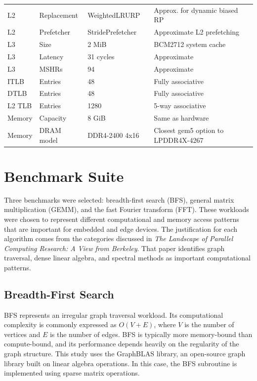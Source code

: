 \documentclass[acmlarge]{acmart}
\begin{document}
\begin{table}[htbp]
\begin{tabularx}{\textwidth}{ll l l X}
L2 & Replacement & WeightedLRURP & \cite{armCortexA76Product} & Approx. for dynamic biased RP \\
L2 & Prefetcher & StridePrefetcher & \cite{FetchBench,armCortexA76Product} & Approximate L2 prefetching \\
\midrule
L3 & Size & 2 MiB & \cite{Raspberry_Pi_5_2026} & BCM2712 system cache \\
L3 & Latency & 31 cycles & \cite{Android_Authority_2018} & Approximate \\
L3 & MSHRs & 94 & \cite{A76G76} & Approximate \\
\midrule
ITLB & Entries & 48 & \cite{armCortexA76Product} & Fully associative \\
DTLB & Entries & 48 & \cite{armCortexA76Product} & Fully associative \\
L2 TLB & Entries & 1280 & \cite{armCortexA76Product} & 5-way associative \\
\midrule
Memory & Capacity & 8 GiB & \cite{Raspberry_Pi_5_2026} & Same as hardware \\
Memory & DRAM model & DDR4-2400 4x16 & \cite{Raspberry_Pi_5_2026} & Closest gem5 option to LPDDR4X-4267 \\
\bottomrule
\end{tabularx}
\end{table}



\section{Benchmark Suite}

Three benchmarks were selected: breadth-first search (BFS), general matrix
multiplication (GEMM), and the fast Fourier transform (FFT). These workloads were
chosen to represent different computational and memory access patterns that are
important for embedded and edge devices. The justification for each algorithm
comes from the categories discussed in \textit{The Landscape of Parallel
Computing Research: A View from Berkeley}\cite{berkley-view}. That paper
identifies graph traversal, dense linear algebra, and spectral methods as
important computational patterns.

\subsection{Breadth-First Search}

BFS represents an irregular graph traversal workload. Its computational
complexity is commonly expressed as \(O(V + E)\), where \(V\) is the number of
vertices and \(E\) is the number of edges. BFS is typically more memory-bound
than compute-bound, and its performance depends heavily on the regularity of the
graph structure. This study uses the GraphBLAS library, an open-source graph
library built on linear algebra operations\cite{GraphBLAS}. In this case, the
BFS subroutine is implemented using sparse matrix operations.
\end{document}
